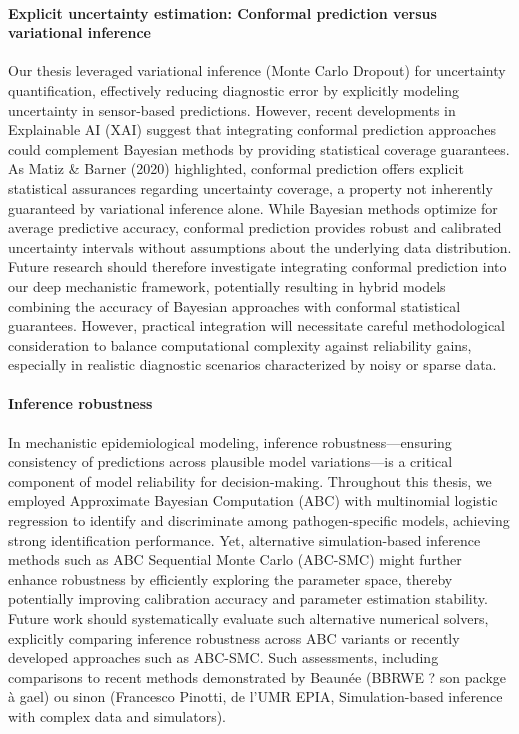 \paragraph{Explicit uncertainty estimation: Conformal prediction versus variational inference} Our thesis leveraged variational inference (Monte Carlo Dropout) for uncertainty quantification, effectively reducing diagnostic error by explicitly modeling uncertainty in sensor-based predictions. However, recent developments in Explainable AI (XAI) suggest that integrating conformal prediction approaches could complement Bayesian methods by providing statistical coverage guarantees. As Matiz \& Barner (2020) highlighted, conformal prediction offers explicit statistical assurances regarding uncertainty coverage, a property not inherently guaranteed by variational inference alone. While Bayesian methods optimize for average predictive accuracy, conformal prediction provides robust and calibrated uncertainty intervals without assumptions about the underlying data distribution. Future research should therefore investigate integrating conformal prediction into our deep mechanistic framework, potentially resulting in hybrid models combining the accuracy of Bayesian approaches with conformal statistical guarantees. However, practical integration will necessitate careful methodological consideration to balance computational complexity against reliability gains, especially in realistic diagnostic scenarios characterized by noisy or sparse data.

\paragraph{Inference robustness} In mechanistic epidemiological modeling, inference robustness—ensuring consistency of predictions across plausible model variations—is a critical component of model reliability for decision-making. Throughout this thesis, we employed Approximate Bayesian Computation (ABC) with multinomial logistic regression to identify and discriminate among pathogen-specific models, achieving strong identification performance. Yet, alternative simulation-based inference methods such as ABC Sequential Monte Carlo (ABC-SMC) might further enhance robustness by efficiently exploring the parameter space, thereby potentially improving calibration accuracy and parameter estimation stability. Future work should systematically evaluate such alternative numerical solvers, explicitly comparing inference robustness across ABC variants or recently developed approaches such as ABC-SMC. Such assessments, including comparisons to recent methods demonstrated by Beaunée (BBRWE ? son packge à gael) ou sinon (Francesco Pinotti, de l'UMR EPIA, Simulation-based inference with complex data and simulators).

